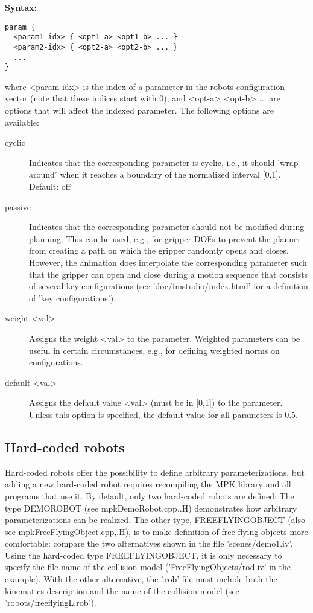 \documentclass[letter,12pt]{article}
\begin{document}
\begin{description}
  {\bf Syntax:}
\begin{verbatim}
param {
  <param1-idx> { <opt1-a> <opt1-b> ... }
  <param2-idx> { <opt2-a> <opt2-b> ... }
  ...
}
\end{verbatim}
  where <param-idx> is the index of a parameter in the robots
  configuration vector (note that these indices start with 0), and
  <opt-a> <opt-b> ... are options that will affect the indexed
  parameter.  The following options are available:

\begin{description}
  
\item[cyclic] Indicates that the corresponding parameter is cyclic,
  i.e., it should 'wrap around' when it reaches a boundary of the
  normalized interval [0,1].  Default: off
  
\item[passive] Indicates that the corresponding parameter should not
  be modified during planning.  This can be used, e.g., for gripper
  DOFs to prevent the planner from creating a path on which the
  gripper randomly opens and closes.  However, the animation does
  interpolate the corresponding parameter such that the gripper can
  open and close during a motion sequence that consists of several key
  configurations (see 'doc/fmstudio/index.html' for a definition of
  'key configurations').
 
\item[weight <val>] Assigns the weight <val> to the parameter.
  Weighted parameters can be useful in certain circumstances, e.g.,
  for defining weighted norms on configurations.
  
\item[default <val>] Assigns the default value <val> (must be in
  [0,1]) to the parameter.  Unless this option is specified, the
  default value for all parameters is 0.5.

\end{description}


\end{description}



\subsection{Hard-coded robots}
\label{sec:rob_hardcoded}

Hard-coded robots offer the possibility to define arbitrary
parameterizations, but adding a new hard-coded robot requires
recompiling the MPK library and all programs that use it.  By default,
only two hard-coded robots are defined: The type DEMOROBOT (see
mpkDemoRobot.cpp,.H) demonstrates how arbitrary parameterizations can
be realized.  The other type, FREEFLYINGOBJECT (also see
mpkFreeFlyingObject.cpp,.H), is to make definition of free-flying
objects more comfortable: compare the two alternatives shown in the
file 'scenes/demo1.iv'.  Using the hard-coded type FREEFLYINGOBJECT, it
is only necessary to specify the file name of the collision model
('FreeFlyingObjects/rod.iv' in the example).  With the other
alternative, the '.rob' file must include both the kinematics
description and the name of the collision model (see
'robots/freeflyingL.rob').
\end{document}
